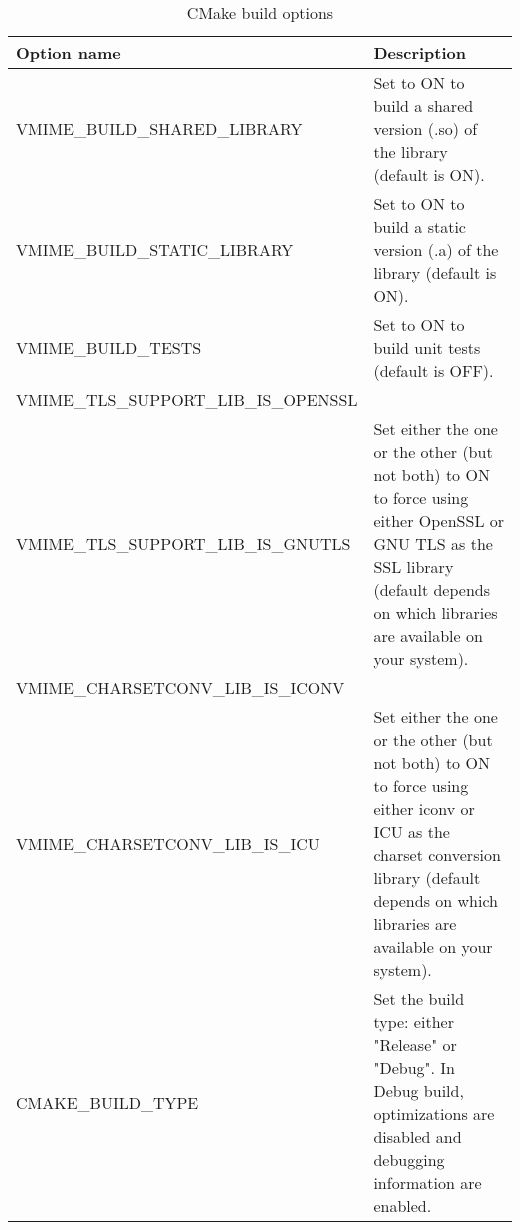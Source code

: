 \begin{table}[!ht]
\noindent\begin{tabularx}{1.0\textwidth}{|l|X|}
\hline
	{\bf Option name} &
	{\bf Description} \\
\hline
\hline
VMIME\_BUILD\_SHARED\_LIBRARY &
Set to ON to build a shared version (.so) of the library (default is ON). \\
\hline
VMIME\_BUILD\_STATIC\_LIBRARY &
Set to ON to build a static version (.a) of the library (default is ON). \\
\hline
VMIME\_BUILD\_TESTS &
Set to ON to build unit tests (default is OFF). \\
\hline
VMIME\_TLS\_SUPPORT\_LIB\_IS\_OPENSSL \\ VMIME\_TLS\_SUPPORT\_LIB\_IS\_GNUTLS &
Set either the one or the other (but not both) to ON to force using either OpenSSL
or GNU TLS as the SSL library (default depends on which libraries are available on
your system). \\
\hline
VMIME\_CHARSETCONV\_LIB\_IS\_ICONV \\ VMIME\_CHARSETCONV\_LIB\_IS\_ICU &
Set either the one or the other (but not both) to ON to force using either iconv
or ICU as the charset conversion library (default depends on which libraries are
available on your system). \\
\hline
CMAKE\_BUILD\_TYPE &
Set the build type: either "Release" or "Debug". In Debug build, optimizations
are disabled and debugging information are enabled. \\
\hline
\end{tabularx}
\caption{CMake build options}
\end{table}
